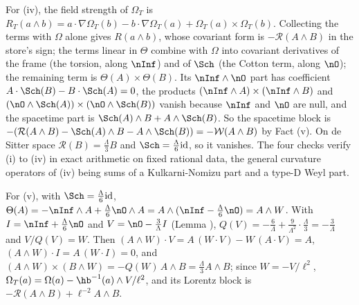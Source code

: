 For (iv), the field strength of $\Omega_{T}$ is $R_{T}(a \wedge b) = a \cdot \nabla\Omega_{T}(b) - b \cdot \nabla\Omega_{T}(a) + \Omega_{T}(a) \times \Omega_{T}(b)$. Collecting the terms with $\Omega$ alone gives $R(a \wedge b)$, whose covariant form is $-\mathcal{R}(A \wedge B)$ in the store's sign; the terms linear in $\Theta$ combine with $\Omega$ into covariant derivatives of the frame (the torsion, along $\nInf$) and of $\Sch$ (the Cotton term, along $\nO$); the remaining term is $\Theta(A) \times \Theta(B)$. Its $\nInf \wedge \nO$ part has coefficient $A \cdot \Sch(B) - B \cdot \Sch(A) = 0$, the products $(\nInf \wedge A) \times (\nInf \wedge B)$ and $(\nO \wedge \Sch(A)) \times (\nO \wedge \Sch(B))$ vanish because $\nInf$ and $\nO$ are null, and the spacetime part is $\Sch(A) \wedge B + A \wedge \Sch(B)$. So the spacetime block is $-(\mathcal{R}(A \wedge B) - \Sch(A) \wedge B - A \wedge \Sch(B)) = -\mathcal{W}(A \wedge B)$ by Fact (v). On de Sitter space $\mathcal{R}(B) = \tfrac{\Lambda}{3}B$ and $\Sch = \tfrac{\Lambda}{6}\mathrm{id}$, so it vanishes. The four checks verify (i) to (iv) in exact arithmetic on fixed rational data, the general curvature operators of (iv) being sums of a Kulkarni-Nomizu part and a type-D Weyl part.


For (v), with $\Sch = \tfrac{\Lambda}{6}\mathrm{id}$, $\Theta(A) = -\nInf \wedge A + \tfrac{\Lambda}{6}\nO \wedge A = A \wedge (\nInf - \tfrac{\Lambda}{6}\nO) = A \wedge W$. With $I = \nInf + \tfrac{\Lambda}{6}\nO$ and $V = \nO - \tfrac{3}{\Lambda}I$ (Lemma ), $Q(V) = -\tfrac{6}{\Lambda} + \tfrac{9}{\Lambda^{2}}\cdot\tfrac{\Lambda}{3} = -\tfrac{3}{\Lambda}$ and $V/Q(V) = W$. Then $(A \wedge W) \cdot V = A\,(W \cdot V) - W\,(A \cdot V) = A$, $(A \wedge W) \cdot I = A\,(W \cdot I) = 0$, and $(A \wedge W) \times (B \wedge W) = -Q(W)\,A \wedge B = \tfrac{\Lambda}{3}A \wedge B$; since $W = -V/\ell^{2}$, $\Omega_{T}(a) = \Omega(a) - \hb^{-1}(a) \wedge V/\ell^{2}$, and its Lorentz block is $-\mathcal{R}(A \wedge B) + \ell^{-2}A \wedge B$.